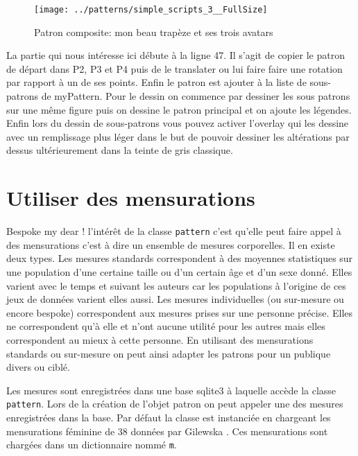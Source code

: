 \documentclass[10pt,a4paper,twoside]{report}
\begin{document}



\begin{figure}
\begin{center}
\texttt{[image: ../patterns/simple\_scripts\_3\_\_FullSize]}
\end{center}
\caption{Patron composite: mon beau trapèze et ses trois avatars}
\label{fig:trapeze}
\end{figure}

La partie qui nous intéresse ici débute à la ligne 47. Il s'agit de copier le patron de départ dans P2, P3 et P4 puis de le translater ou lui faire faire une rotation par rapport à un de ses points. Enfin le patron est ajouter à la liste de sous-patrons de myPattern. Pour le dessin on commence par dessiner les sous patrons sur une même figure puis on dessine le patron principal et on ajoute les légendes. Enfin lors du dessin de sous-patrons vous pouvez activer l'overlay qui les dessine avec un remplissage plus léger dans le but de pouvoir dessiner les altérations par dessus ultérieurement dans la teinte de gris classique.


\section{Utiliser des mensurations}

Bespoke my dear ! l'intérêt de la classe \texttt{pattern} c'est qu'elle peut faire appel à des mensurations c'est à dire un ensemble de mesures corporelles. Il en existe deux types. Les mesures standards correspondent à des moyennes statistiques sur une population d'une certaine taille ou d'un certain âge et d'un sexe donné. Elles varient avec le temps et suivant les auteurs car les populations à l'origine de ces jeux de données varient elles aussi. Les mesures individuelles (ou sur-mesure ou encore bespoke) correspondent aux mesures prises sur une personne précise. Elles ne correspondent qu'à elle et n'ont aucune utilité pour les autres mais elles correspondent au mieux à cette personne.
En utilisant des mensurations standards ou sur-mesure on peut ainsi adapter les patrons pour un publique divers ou ciblé.

Les mesures sont enregistrées dans une base sqlite3 à laquelle accède la classe \texttt{pattern}. Lors de la création de l'objet patron on peut appeler une des mesures enregistrées dans la base. Par défaut la classe est instanciée en chargeant les mensurations féminine de 38 données par Gilewska \cite{Gilewska1}. Ces mensurations sont chargées dans un dictionnaire nommé \texttt{m}.
\end{document}
